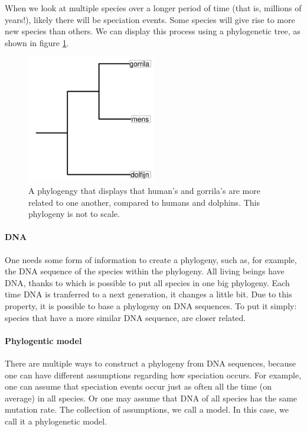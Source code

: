 When we look at multiple species over a longer period of 
time (that is, millions of years!), likely there will be speciation
events. Some species will give rise to more new species than others.
We can display this process using a phylogenetic tree, as shown
in figure \ref{fig:phylogeny}.

\begin{figure}
  \centering
  \includegraphics[width=0.5\textwidth]{phylogeny.png}
  \caption{
    A phylogengy that displays that human's and gorrila's
    are more related to one another, compared to
    humans and dolphins.
    This phylogeny is not to scale.
  }
  \label{fig:phylogeny}
\end{figure}

\paragraph{DNA}

One needs some form of information to create a phylogeny,
such as, for example, the DNA sequence of the species
within the phylogeny.
All living beings have DNA, thanks to which is possible 
to put all species in one big phylogeny.
Each time DNA is tranferred to a next generation, it
changes a little bit.
Due to this property, it is possible to base a phylogeny
on DNA sequences.
To put it simply: species that have a more similar DNA sequence, are
closer related.

\paragraph{Phylogentic model}

There are multiple ways to construct a phylogeny
from DNA sequences, because one can have different 
assumptions regarding how speciation occurs.
For example, one can assume that speciation events
occur just as often all the time (on average) in all species.
Or one may assume that DNA of all species has the same mutation rate.
The collection of assumptions, we call a model. In this case,
we call it a phylogenetic model.

